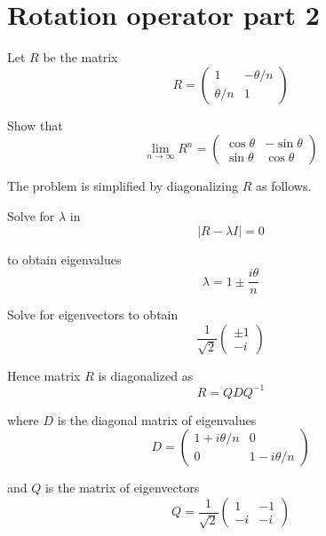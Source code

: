 


\section*{Rotation operator part 2}

Let $R$ be the matrix
\begin{equation*}
R=\begin{pmatrix}
1 & -\theta/n
\\
\theta/n & 1
\end{pmatrix}
\end{equation*}

Show that
\begin{equation*}
\lim_{n\rightarrow\infty}R^n=\begin{pmatrix}
\cos\theta & -\sin\theta
\\
\sin\theta & \cos\theta
\end{pmatrix}
\end{equation*}

The problem is simplified by diagonalizing $R$ as follows.

\bigskip
Solve for $\lambda$ in
\begin{equation*}
|R-\lambda I|=0
\end{equation*}

to obtain eigenvalues
\begin{equation*}
\lambda=1\pm\frac{i\theta}{n}
\end{equation*}

Solve for eigenvectors to obtain
\begin{equation*}
\frac{1}{\sqrt2}\begin{pmatrix}
\pm1
\\
-i
\end{pmatrix}
\end{equation*}

Hence matrix $R$ is diagonalized as
\begin{equation*}
R=QDQ^{-1}
\end{equation*}

where $D$ is the diagonal matrix of eigenvalues
\begin{equation*}
D=\begin{pmatrix}
1+i\theta/n & 0
\\
0 & 1-i\theta/n
\end{pmatrix}
\end{equation*}

and $Q$ is the matrix of eigenvectors
\begin{equation*}
Q=\frac{1}{\sqrt2}\begin{pmatrix}
1 & -1
\\
-i & -i
\end{pmatrix}
\end{equation*}

